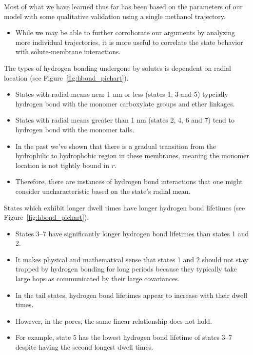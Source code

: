 \documentclass{article}
\begin{document}
  Most of what we have learned thus far has been based on the parameters of our
  model with some qualitative validation using a single methanol trajectory.
  \begin{itemize}
    \item While we may be able to further corroborate our arguments by analyzing more
    individual trajectories, it is more useful to correlate the state behavior with
    solute-membrane interactions.
  \end{itemize}   

  \noindent The types of hydrogen bonding undergone by solutes is dependent on radial
  location (see Figure~\ref{fig:hbond_pichart}).
  \begin{itemize}
    \item States with radial means near 1 nm or less (states 1, 3 and 5) typcially
    hydrogen bond with the monomer carboxylate groups and ether linkages.
    \item States with radial means greater than 1 nm (states 2, 4, 6 and 7) tend 
    to hydrogen bond with the monomer tails.
    \item In the past we've shown that there is a gradual transition from the
  	hydrophilic to hydrophobic region in these membranes, meaning the monomer
  	location is not tightly bound in $r$.
  	\item Therefore, there are instances of hydrogen bond interactions that one
  	might consider uncharacteristic based on the state's radial mean.
  \end{itemize}  
  
  \noindent States which exhibit longer dwell times have longer hydrogen bond lifetimes (see
  Figure~\ref{fig:hbond_pichart}).
  \begin{itemize}
    \item States 3--7 have significantly longer hydrogen bond lifetimes than states
    1 and 2. 
    \item It makes physical and mathematical sense that states 1 and 2 should not 
    stay trapped by hydrogen bonding for long periods because they typically take large
    hops as communicated by their large covariances.
    \item In the tail states, hydrogen bond lifetimes appear to increase with 
    their dwell times.
    \item However, in the pores, the same linear relationship does not hold.
    \item For example, state 5 has the lowest hydrogen bond lifetime of states 3--7
    despite having the second longest dwell times. 
  \end{itemize}
  
\end{document}
